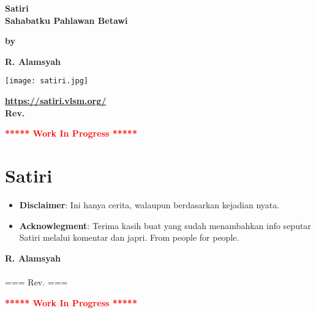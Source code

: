 \documentclass[12pt]{book}
\newcommand{\pengarangs}{%
    R. Alamsyah\\
}
\newcommand{\judul}{%
Satiri\\[13pt]
Sahabatku Pahlawan Betawi
}
\begin{document}
\begin{titlepage}
    \begin{center}    

    \vspace*{35mm}
    \textbf{\Large \judul}

    \vspace*{30mm}       
    \textbf{by}

    \vspace*{15mm}    
    \textbf{\Large \pengarangs}

    \vspace*{4.0cm}

    \begin{center}
        \texttt{[image: satiri.jpg]}
    \end{center}

    \textbf{
       \url{https://satiri.vlsm.org/} \\[10pt]
       Rev. \rev%
    }

    \vspace*{5mm}    
    \textbf{\LARGE \textcolor{red}{***** Work In Progress *****}}

    \end{center}

\end{titlepage}


\tableofcontents

\newpage

\chapter*{Satiri}

\noindent
\begin{itemize}
\item \textbf{Disclaimer}: Ini hanya cerita, walaupun berdasarkan kejadian nyata.
\item \textbf{Acknowlegment}:  Terima kasih buat yang sudah menambahkan info seputar Satiri melalui komentar dan japri. From people for people.
\end{itemize}

\vspace*{15mm}
\textbf{\Large \pengarangs}
\\[10pt]
\noindent
=== Rev. \rev ===

\newpage


















\vspace*{5mm}    
\textbf{\LARGE \textcolor{red}{***** Work In Progress *****}}

\end{document}
